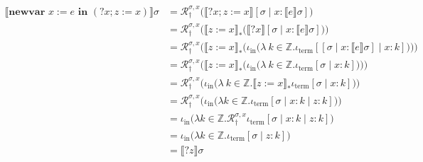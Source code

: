 \documentclass[a4paper, 12pt]{article}
\begin{document}
\begin{align*}
  \llbracket \textbf{newvar } x:= e \textbf{ in } (?x;z := x) \rrbracket\sigma 
  &=\mathcal{R}_\dagger^{\sigma, x} \Big( \llbracket ?x; z := x
  \rrbracket[\sigma \mid x : \llbracket e \rrbracket\sigma] \Big) \\ 
  &=\mathcal{R}_\dagger^{\sigma, x}\Big( \llbracket z := x \rrbracket_*\big(
  \llbracket ?x \rrbracket[\sigma\mid x : \llbracket e \rrbracket\sigma] \big)
\Big) \\ 
  &=\mathcal{R}_\dagger^{\sigma, x}\Big( \llbracket z := x \rrbracket_* \Big(
  \iota_{\text{in}} \big( \lambda ~ k \in \mathbb{Z}.\iota_{\text{term}}[[\sigma
\mid x : \llbracket e \rrbracket\sigma] \mid x : k] \big) \Big) \Big) \\ 
  &=\mathcal{R}_\dagger^{\sigma, x}\Big( \llbracket z := x \rrbracket_*\Big(
  \iota_{\text{in}} \big( \lambda ~ k \in \mathbb{Z}. \iota_{\text{term}}[\sigma
\mid x : k] \big) \Big) \Big) \\ 
  &=\mathcal{R}_\dagger^{\sigma, x}\Big( \iota_{\text{in}}\Big( \lambda ~ k \in
  \mathbb{Z}. \llbracket z := x \rrbracket_*\iota_{\text{term}}[\sigma \mid x :
k]\Big) \Big) \\ 
  &=\mathcal{R}_\dagger^{\sigma, x} \Big( \iota_{\text{in}} \Big( \lambda k \in
  \mathbb{Z}. \iota_{\text{term}}[\sigma \mid x : k \mid z : k]\Big) \Big) \\ 
  &=\iota_{\text{in}} \Big( \lambda k \in \mathbb{Z}.
  \mathcal{R}_\dagger^{\sigma, x}\iota_{\text{term}}[\sigma \mid x : k \mid z : k]
\Big) \\ 
  &= \iota_{\text{in}} \Big( \lambda k \in \mathbb{Z}.
  \iota_{\text{term}}[\sigma \mid z : k] \Big) \\ 
  &= \llbracket ?z \rrbracket\sigma
\end{align*}
\end{document}
